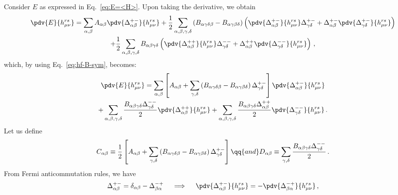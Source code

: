 \begin{tabproof}

	Consider $E$ as expressed in Eq.~\eqref{eq:E=<H>}. Upon taking the derivative, we obtain
	\begin{multline*}
		\pdv{E}{h_{\mu\nu}^{rs}} = \sum_{\alpha,\beta} A_{\alpha\beta} \pdv{\Delta_{\alpha\beta}^{+-}}{h_{\mu\nu}^{rs}} + \frac{1}{2} \sum_{\alpha,\beta,\gamma,\delta} \left(
			B_{\alpha\gamma\delta\beta} - B_{\alpha\gamma\beta\delta}
		\right) \left(
			\pdv{\Delta_{\alpha\beta}^{+-}}{h_{\mu\nu}^{rs}} \Delta_{\gamma\delta}^{+-} + \Delta_{\alpha\beta}^{+-} \pdv{\Delta_{\gamma\delta}^{+-}}{h_{\mu\nu}^{rs}}
		\right) \\
		+ \frac{1}{2} \sum_{\alpha,\beta,\gamma,\delta} B_{\alpha\beta\gamma\delta} \left(
			\pdv{\Delta_{\alpha\beta}^{++}}{h_{\mu\nu}^{rs}} \Delta_{\gamma\delta}^{--} + \Delta_{\alpha\beta}^{++} \pdv{\Delta_{\gamma\delta}^{--}}{h_{\mu\nu}^{rs}} 
		\right) \, ,
	\end{multline*}
	which, by using Eq.~\eqref{eq:hf-B-sym}, becomes:
	\begin{multline}
		\pdv{E}{h_{\mu\nu}^{rs}} = \sum_{\alpha,\beta} \left[
			A_{\alpha\beta} + \sum_{\gamma,\delta}
			\left(
				B_{\alpha\gamma\delta\beta} - B_{\alpha\gamma\beta\delta}
			\right) \Delta_{\gamma\delta}^{+-} 
		\right] \pdv{\Delta_{\alpha\beta}^{+-}}{h_{\mu\nu}^{rs}} \\
		+ \sum_{\alpha,\beta,\gamma,\delta} \frac{B_{\alpha\beta\gamma\delta}
		\Delta_{\gamma\delta}^{--}}{2} \pdv{\Delta_{\alpha\beta}^{++}}{h_{\mu\nu}^{rs}} + \sum_{\alpha,\beta,\gamma,\delta} \frac{B_{\alpha\beta\gamma\delta} \Delta_{\alpha\beta}^{++}}{2} \pdv{\Delta_{\gamma\delta}^{--}}{h_{\mu\nu}^{rs}} \, . \label{eq:hf-variational-CD-int}
	\end{multline}
	Let us define
	\begin{equation}\label{eq:hf-CD-definition}
		C_{\alpha\beta} \equiv 
		\frac{1}{2} \left[
			A_{\alpha\beta} + \sum_{\gamma,\delta}
			\left(
				B_{\alpha\gamma\delta\beta} - B_{\alpha\gamma\beta\delta}
			\right) \Delta_{\gamma\delta}^{+-} 
		\right]
		\qq{and}
		D_{\alpha\beta} \equiv \sum_{\gamma,\delta} \frac{B_{\alpha\beta\gamma\delta} \Delta_{\gamma\delta}^{--}}{2} \, .
	\end{equation}
	From Fermi anticommutation rules, we have
	\[
		\Delta_{\alpha\beta}^{+-} = \delta_{\alpha\beta} - \Delta_{\beta\alpha}^{-+}
		\quad\implies\quad
		\pdv{\Delta_{\alpha\beta}^{+-}}{h_{\mu\nu}^{rs}} = -\pdv{\Delta_{\beta\alpha}^{-+}}{h_{\mu\nu}^{rs}} \, ,
\]
\end{tabproof}
